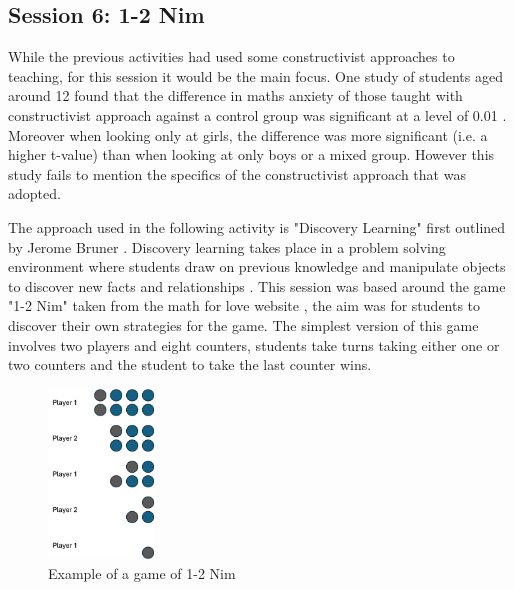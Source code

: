 \documentclass[11pt, a4paper, notitlepage]{article}
\begin{document}
\subsection{Session 6: 1-2 Nim}
While the previous activities had used some constructivist approaches to teaching, for this session it would be the main focus. One study of students aged around 12 found that the difference in maths anxiety of those taught with constructivist approach against a control group was significant at a level of 0.01 \cite{Suman:2021}. Moreover when looking only at girls, the difference was more significant (i.e. a higher t-value) than when looking at only boys or a mixed group. However this study fails to mention the specifics of the constructivist approach that was adopted. 
\par
The approach used in the following activity is "Discovery Learning" first outlined by Jerome Bruner \cite{Bruner:1961}. Discovery learning takes place in a problem solving environment where students draw on previous knowledge and manipulate objects to discover new facts and relationships \cite{learning-theories:Discovery-learning}. This session was based around the game "1-2 Nim" taken from the math for love website \cite{1-2Nim}, the aim was for students to discover their own strategies for the game. The simplest version of this game involves two players and eight counters, students take turns taking either one or two counters and the student to take the last counter wins.
\par
\begin{figure}
    \includegraphics[width=0.25\textwidth]{Images/1-2Nim_example.png}
    \caption{Example of a game of 1-2 Nim}
    \end{figure}
\end{document}
